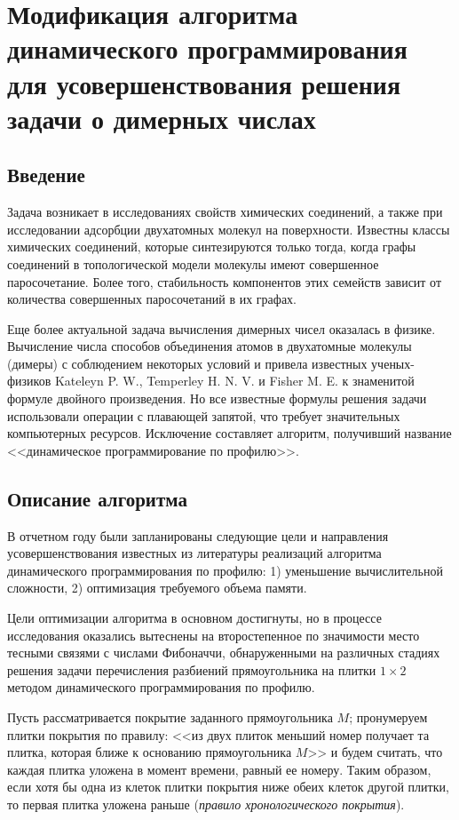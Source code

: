 \chapter{Модификация алгоритма динамического программирования для усовершенствования решения задачи о димерных числах}

\section{Введение}

Задача возникает в исследованиях свойств химических соединений, а также при исследовании адсорбции двухатомных молекул на поверхности. 
Известны классы химических соединений, которые синтезируются только тогда, когда графы соединений в топологической модели молекулы имеют совершенное паросочетание. Более того, стабильность компонентов этих семейств зависит от количества совершенных паросочетаний в их графах.

Еще более актуальной задача вычисления димерных чисел оказалась в физике. Вычисление числа способов объединения атомов в двухатомные молекулы (димеры) с соблюдением некоторых условий и привела известных ученых-физиков Kateleyn P. W., Temperley H. N. V. и Fisher M. E. к знаменитой формуле двойного произведения. Но все известные формулы решения задачи использовали операции с плавающей запятой, что требует значительных компьютерных ресурсов.
Исключение составляет алгоритм, получивший название <<динамическое программирование по профилю>>.


\section{Описание алгоритма}

В отчетном году были запланированы следующие цели и направления усовершенствования известных из литературы реализаций алгоритма динамического программирования по профилю: 1) уменьшение вычислительной сложности, 2) оптимизация требуемого объема памяти.

Цели оптимизации алгоритма в основном достигнуты, но в процессе исследования оказались вытеснены на второстепенное по значимости место тесными связями с числами Фибоначчи, обнаруженными на различных стадиях решения задачи перечисления разбиений прямоугольника на плитки $1\times 2$ методом динамического программирования по профилю.

Пусть рассматривается покрытие заданного прямоугольника $M$; пронумеруем плитки покрытия по правилу: <<из двух плиток меньший номер получает та плитка, которая ближе к основанию прямоугольника $M$>> и будем считать, что каждая плитка уложена в момент времени, равный ее номеру. Таким образом, если  хотя бы одна из клеток плитки покрытия ниже обеих клеток другой плитки, то первая плитка уложена раньше  (\textit{правило хронологического покрытия}).

